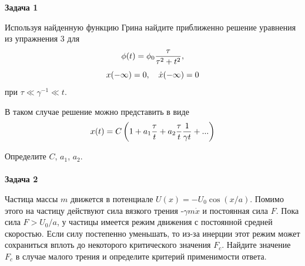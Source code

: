 \documentclass[a4paper,12pt]{article}
\begin{document}
\vspace{15pt}
\noindent \textbf{Задача 1}

\noindent Используя найденную функцию Грина найдите приближенно решение уравнения из упражнения 3 для
\begin{equation}\notag
\phi(t)	=\phi_{0}\frac{\tau}{\tau^{2}+t^{2}},
\end{equation}
\begin{equation}\notag
x(-\infty)	=0,\quad\dot{x}(-\infty)=0
\end{equation}
\noindent при $\tau\ll\gamma^{-1}\ll t$.

\noindent В таком случае решение можно представить в виде
\begin{equation}\notag
x(t)	=C\left(1+a_{1}\frac{\tau}{t}+a_{2}\frac{\tau}{t}\frac{1}{\gamma t}+...\right)
\end{equation}

\noindent Определите $C$, $a_{1}$, $a_{2}$.\\\\

\vspace{15pt}
\noindent \textbf{Задача 2}

\noindent Частица массы $m$ движется в потенциале $U(x)=-U_{0}\cos\left(x/a\right)$. Помимо этого на частицу действуют сила вязкого трения -$\gamma m\dot{x}$ и постоянная сила $F$. Пока сила $F>U_{0}/a$, у частицы имеется режим движения с постоянной средней скоростью. Если силу постепенно уменьшать, то из-за инерции этот режим может сохраниться вплоть до некоторого критического значения $F_{c}$. Найдите значение $F_{c}$ в случае малого трения и определите критерий применимости ответа.
\end{document}
